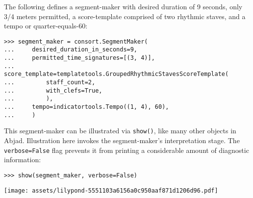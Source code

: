 The following defines a segment-maker with desired duration of 9 seconds, only
3/4 meters permitted, a score-template comprised of two rhythmic staves, and a
tempo or quarter-equals-60:

\begin{comment}
<abjad>
segment_maker = consort.SegmentMaker(
    desired_duration_in_seconds=9,
    permitted_time_signatures=[(3, 4)],
    score_template=templatetools.GroupedRhythmicStavesScoreTemplate(
        staff_count=2,
        with_clefs=True,
        ),
    tempo=indicatortools.Tempo((1, 4), 60),
    )
</abjad>
\end{comment}

\begin{abjadbookoutput}
\begin{singlespacing}
\vspace{-0.5\baselineskip}
\begin{lstlisting}
>>> segment_maker = consort.SegmentMaker(
...     desired_duration_in_seconds=9,
...     permitted_time_signatures=[(3, 4)],
...     score_template=templatetools.GroupedRhythmicStavesScoreTemplate(
...         staff_count=2,
...         with_clefs=True,
...         ),
...     tempo=indicatortools.Tempo((1, 4), 60),
...     )
\end{lstlisting}
\end{singlespacing}
\end{abjadbookoutput}

\noindent This segment-maker can be illustrated via \texttt{show()}, like many
other objects in Abjad. Illustration here invokes the segment-maker's
interpretation stage. The \texttt{verbose=False} flag prevents it from
printing a considerable amount of diagnostic information:

\begin{comment}
<abjad>[stylesheet=../consort.ily]
show(segment_maker, verbose=False)
</abjad>
\end{comment}

\begin{abjadbookoutput}
\begin{singlespacing}
\vspace{-0.5\baselineskip}
\begin{lstlisting}
>>> show(segment_maker, verbose=False)
\end{lstlisting}
\noindent\texttt{[image: assets/lilypond-5551103a6156a0c950aaf871d1206d96.pdf]}
\end{singlespacing}
\end{abjadbookoutput}

